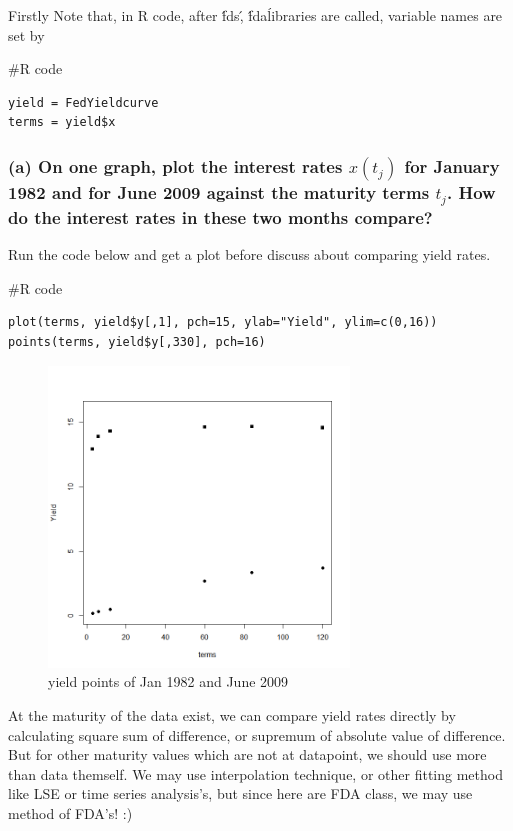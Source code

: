 \documentclass{article}
\newenvironment{Rcode}%
{%
    \begin{mdframed}
    \#R code
    \begin{small}
}
{%
    \end{small}
    \end{mdframed}
}
\begin{document}
Firstly Note that, in R code, after \'fds\', \'fda\' libraries are called, variable names are set by
\begin{Rcode}
    \begin{verbatim}
yield = FedYieldcurve
terms = yield$x
    \end{verbatim}
\end{Rcode}


\subsubsection*{(a) On one graph, plot the interest rates $x(t_j)$ for January 1982 and for June 2009 against the maturity terms $t_j$. How do the interest rates in these two months compare?}
Run the code below and get a plot before discuss about comparing yield rates.
\begin{Rcode}
    \begin{verbatim}
plot(terms, yield$y[,1], pch=15, ylab="Yield", ylim=c(0,16)) 
points(terms, yield$y[,330], pch=16)
    \end{verbatim}
\end{Rcode}
\begin{figure}[hh]
    \centering
    \includegraphics[height=8cm]{yield_2terms.png}
    \caption{yield points of Jan 1982 and June 2009}
\end{figure}
At the maturity of the data exist, we can compare yield rates directly by calculating square sum of difference, or supremum of absolute value of difference.
But for other maturity values which are not at datapoint, 
we should use more than data themself. We may use interpolation technique, or other fitting method like LSE or time series analysis's,
but since here are FDA class, we may use method of FDA's! :)
\end{document}
